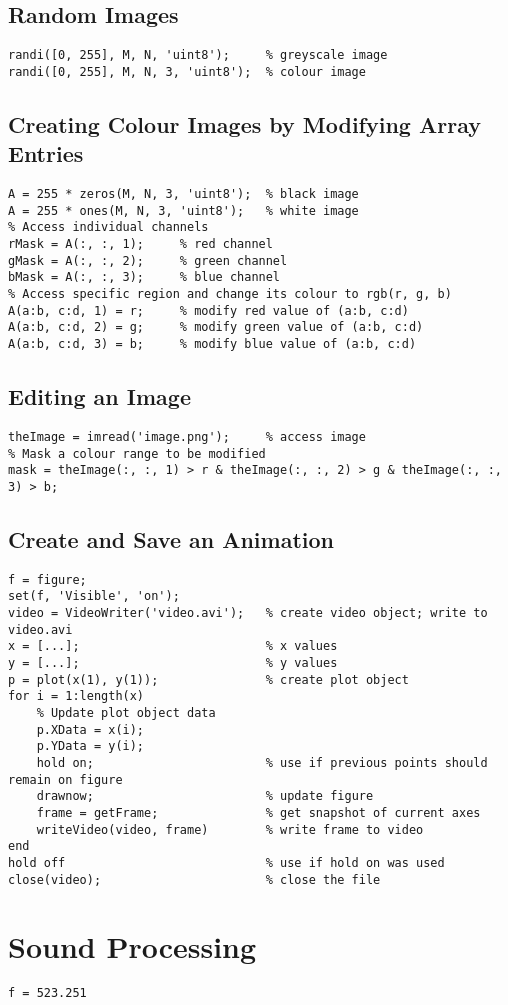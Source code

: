 \documentclass{article}
\begin{document}
\subsection*{Random Images}
\begin{lstlisting}
randi([0, 255], M, N, 'uint8');     % greyscale image
randi([0, 255], M, N, 3, 'uint8');  % colour image
\end{lstlisting}
\subsection*{Creating Colour Images by Modifying Array Entries}
\begin{lstlisting}
A = 255 * zeros(M, N, 3, 'uint8');  % black image
A = 255 * ones(M, N, 3, 'uint8');   % white image
% Access individual channels
rMask = A(:, :, 1);     % red channel
gMask = A(:, :, 2);     % green channel
bMask = A(:, :, 3);     % blue channel
% Access specific region and change its colour to rgb(r, g, b)
A(a:b, c:d, 1) = r;     % modify red value of (a:b, c:d)
A(a:b, c:d, 2) = g;     % modify green value of (a:b, c:d)
A(a:b, c:d, 3) = b;     % modify blue value of (a:b, c:d)
\end{lstlisting}
\subsection*{Editing an Image}
\begin{lstlisting}
theImage = imread('image.png');     % access image 
% Mask a colour range to be modified
mask = theImage(:, :, 1) > r & theImage(:, :, 2) > g & theImage(:, :, 3) > b;
\end{lstlisting}
\subsection*{Create and Save an Animation}
\begin{lstlisting}
f = figure;
set(f, 'Visible', 'on');
video = VideoWriter('video.avi');   % create video object; write to video.avi
x = [...];                          % x values
y = [...];                          % y values
p = plot(x(1), y(1));               % create plot object
for i = 1:length(x)
    % Update plot object data
    p.XData = x(i);
    p.YData = y(i);
    hold on;                        % use if previous points should remain on figure
    drawnow;                        % update figure
    frame = getFrame;               % get snapshot of current axes
    writeVideo(video, frame)        % write frame to video
end
hold off                            % use if hold on was used
close(video);                       % close the file
\end{lstlisting}    
\section*{Sound Processing}
\begin{lstlisting}
f = 523.251
\end{lstlisting}
\end{document}
